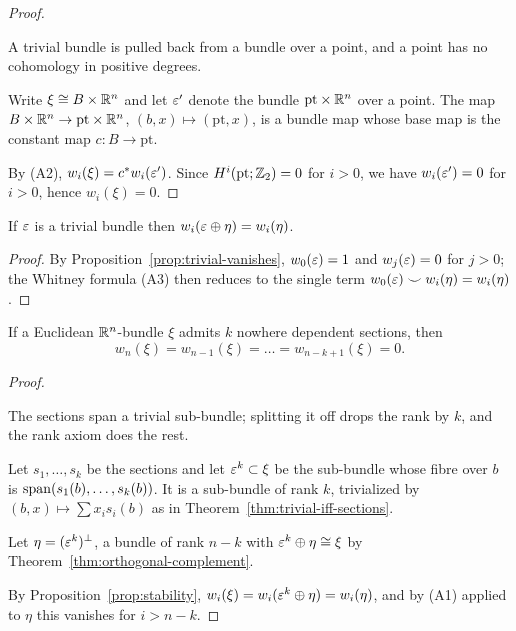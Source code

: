 \begin{proof}
\begin{strategy}
A trivial bundle is pulled back from a bundle over a point, and a point has no
cohomology in positive degrees.
\end{strategy}

 Write $\xi\cong B\times\mathbb{R}^n$ and let $\varepsilon'$ denote the bundle
$\mathrm{pt}\times\mathbb{R}^n$ over a point. The map
$B\times\mathbb{R}^n\to\mathrm{pt}\times\mathbb{R}^n$, $(b,x)\mapsto(\mathrm{pt},x)$, is a
bundle map whose base map is the constant map $c\colon B\to\mathrm{pt}$.

 By (A2), $w_i(\xi)=c^*w_i(\varepsilon')$. Since
$H^i(\mathrm{pt};\mathbb{Z}_2)=0$ for $i>0$, we have $w_i(\varepsilon')=0$ for $i>0$, hence
$w_i(\xi)=0$.
\end{proof}

\begin{proposition}[Stability]\label{prop:stability}
If $\varepsilon$ is a trivial bundle then $w_i(\varepsilon\oplus\eta)=w_i(\eta)$.
\end{proposition}

\begin{proof}
By Proposition~\ref{prop:trivial-vanishes}, $w_0(\varepsilon)=1$ and $w_j(\varepsilon)=0$ for
$j>0$; the Whitney formula (A3) then reduces to the single term
$w_0(\varepsilon)\smile w_i(\eta)=w_i(\eta)$.
\end{proof}

\begin{proposition}\label{prop:sections-kill-top}
If a Euclidean $\mathbb{R}^n$-bundle $\xi$ admits $k$ nowhere dependent sections, then
\[
w_{n}(\xi)=w_{n-1}(\xi)=\dots=w_{n-k+1}(\xi)=0 .
\]
\end{proposition}

\begin{proof}
\begin{strategy}
The sections span a trivial sub-bundle; splitting it off drops the rank by $k$,
and the rank axiom does the rest.
\end{strategy}

 Let $s_1,\dots,s_k$ be the sections and let $\varepsilon^k\subset\xi$ be the
sub-bundle whose fibre over $b$ is $\operatorname{span}(s_1(b),\dots,s_k(b))$. It is a
sub-bundle of rank $k$, trivialized by
$(b,x)\mapsto\sum x_i s_i(b)$ as in Theorem~\ref{thm:trivial-iff-sections}.

 Let $\eta=(\varepsilon^k)^\perp$, a bundle of rank $n-k$ with
$\varepsilon^k\oplus\eta\cong\xi$ by Theorem~\ref{thm:orthogonal-complement}.

 By Proposition~\ref{prop:stability},
$w_i(\xi)=w_i(\varepsilon^k\oplus\eta)=w_i(\eta)$, and by (A1) applied to $\eta$ this
vanishes for $i>n-k$.
\end{proof}

